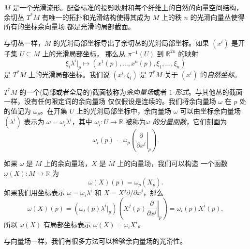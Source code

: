\begin{proposition}[余切丛作为向量丛]
  $M$ 是一个光滑流形。配备标准的投影映射和每个纤维上的自然的向量空间结构，
  余切丛 $T^*M$ 有唯一的拓扑和光滑结构使得其成为 $M$ 
  上的秩 $n$ 的光滑向量丛使得所有的坐标余向量场
  都是光滑的局部截面。
\end{proposition}

与切丛一样，$M$ 的光滑局部坐标导出了余切丛的光滑局部坐标。如果 
$\left(x^i\right)$ 是开子集 $U\subseteq M$ 上的光滑局部坐标，
那么从 $\pi^{-1}(U)$ 到 $\mathbb{R}^{2n}$ 的映射
\[
  \xi_i\lambda^i|_p \mapsto 
  \left(x^1(p),\dots,x^n(p),\xi_1,\dots,\xi_n\right)
\]
是 $T^*M$ 上的光滑局部坐标。我们说 $\left(x^i,\xi_i\right)$ 是
$T^*M$ 关于 $\left(x^i\right)$ 的\emph{自然坐标}。

$T^*M$ 的一个(局部或者全局的)截面被称为\emph{余向量场}或者
\emph{$1$-形式}。与其他丛的截面一样，没有任何限定词的余向量场
仅仅假设是连续的。我们将余向量场 $\omega$ 在 $p$ 处的值记为
$\omega_p$。在开集 $U$ 上的光滑局部坐标中，余向量场 $\omega$
可以由坐标余向量场 $\left(\lambda^i\right)$ 表示为
$\omega=\omega_i\lambda^i$，其中 $\omega_i:U\to \mathbb{R}$
被称为\emph{$\omega$ 的分量函数}，它们刻画为
\[
  \omega_i(p)=\omega_p\left(\left.\frac{\partial}{\partial x^i}\right|_p\right).  
\]

如果 $\omega$ 是 $M$ 上的余向量场，$X$ 是 $M$ 上的向量场，我们可以构造
一个函数 $\omega(X):M\to \mathbb{R}$ 为
\[
  \omega(X)(p)=\omega_p(X_p).  
\]
如果我们用坐标表示 $\omega=\omega_i\lambda^i$ 和 $X=X^j\partial/\partial x^j$，那么
\[
  \omega(X)(p)=\left(\omega_i(p)\lambda^i|_p\right) 
  \left(X^j(p)\left.\frac{\partial}{\partial x^j}\right|_p\right)
  =\omega_i(p)X^i(p),
\]
所以 $\omega(X)$ 有局部坐标表示 $\omega(X)=\omega_iX^i$。

与向量场一样，我们有很多方法可以检验余向量场的光滑性。

